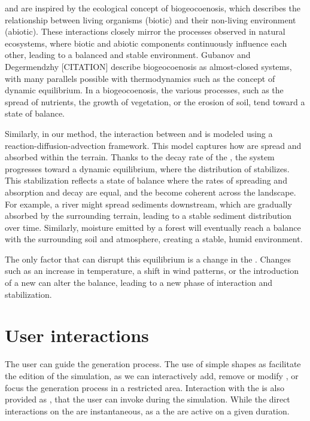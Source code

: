 and  are inspired by the ecological concept of biogeocoenosis, which describes the relationship between living organisms (biotic) and their non-living environment (abiotic). These interactions closely mirror the processes observed in natural ecosystems, where biotic and abiotic components continuously influence each other, leading to a balanced and stable environment. Gubanov and Degermendzhy [CITATION] describe biogeocoenosis as almost-closed systems, with many parallels possible with thermodynamics such as the concept of dynamic equilibrium. In a biogeocoenosis, the various processes, such as the spread of nutrients, the growth of vegetation, or the erosion of soil, tend toward a state of balance. 

Similarly, in our method, the interaction between  and  is modeled using a reaction-diffusion-advection framework. This model captures how  are spread and absorbed within the terrain. Thanks to the decay rate of the , the system progresses toward a dynamic equilibrium, where the distribution of  stabilizes. This stabilization reflects a state of balance where the rates of spreading and absorption and decay are equal, and the  become coherent across the landscape. For example, a river might spread sediments downstream, which are gradually absorbed by the surrounding terrain, leading to a stable sediment distribution over time. Similarly, moisture emitted by a forest will eventually reach a balance with the surrounding soil and atmosphere, creating a stable, humid environment.

The only factor that can disrupt this equilibrium is a change in the . Changes such as an increase in temperature, a shift in wind patterns, or the introduction of a new  can alter the balance, leading to a new phase of interaction and stabilization.


\section{User interactions}
\label{sec:env-obj_interaction}
The user can guide the generation process. The use of simple shapes as  facilitate the edition of the simulation, as we can interactively add, remove or modify , or focus the generation process in a restricted area. Interaction with the  is also provided as , that the user can invoke during the simulation. While the direct interactions on the  are instantaneous, as a the  are active on a given duration.

